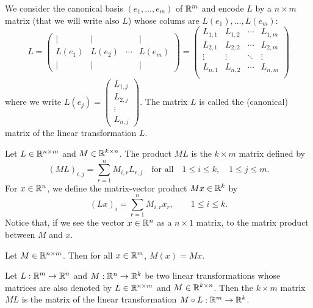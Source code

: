 \documentclass[11pt,nocut]{article}
\begin{document}
We consider the canonical basis $(e_1, \dots, e_m)$ of $\mathbb{R}^m$ and encode $L$ by a $n \times m$ matrix (that we will write also $L$) whose colums are $L(e_1), \dots, L(e_m)$:
$$
L =
\begin{pmatrix}
	| & | & & | \\
	L(e_1) & L(e_2) & \cdots& L(e_m) \\
	| & | & & |
\end{pmatrix}
= 
\begin{pmatrix}
	L_{1,1} & L_{1,2} & \cdots & L_{1,m} \\
	L_{2,1} & L_{2,2} & \cdots & L_{2,m} \\
	\vdots & \vdots & \ddots & \vdots \\
	L_{n,1} & L_{n,2} & \cdots & L_{n,m} \\
\end{pmatrix}
$$
where we write $L(e_j) = 
\begin{pmatrix}
	L_{1,j} \\
	L_{2,j}\\
	\vdots \\
	L_{n,j}
\end{pmatrix}$.
The matrix $L$ is called the (canonical) matrix of the linear transformation $L$.

\begin{definition}
	Let $L \in \mathbb{R}^{n \times m}$ and $M \in \mathbb{R}^{k \times n}$. The product $M L$ is the $k \times m$ matrix defined by
	$$
	(ML)_{i,j} = \sum_{r=1}^n M_{i,r} L_{r,j} \quad \text{for all} \quad 1 \leq i \leq k, \quad 1 \leq j \leq m.
	$$
	For $x \in \mathbb{R}^n$, we define the matrix-vector product $M x \in \mathbb{R}^k$ by
	$$
	(Lx)_i = \sum_{r=1}^n M_{i,r} x_r, \qquad 1 \leq i \leq k.
	$$
	Notice that, if we see the vector $x \in \mathbb{R}^n$ as a $n \times 1$ matrix, to the matrix product between $M$ and $x$.
\end{definition}

\begin{proposition}
	Let $M \in \mathbb{R}^{n \times m}$. Then for all $x \in \mathbb{R}^m$,
	$M(x) = Mx$.
\end{proposition}

\begin{proposition}
	Let $L: \mathbb{R}^m \to \mathbb{R}^n$ and $M: \mathbb{R}^n \to \mathbb{R}^k$ be two linear transformations whose matrices are also denoted by $L \in \mathbb{R}^{n \times m}$ and $M \in \mathbb{R}^{k \times n}$.
	Then the $k \times m$ matrix $ML$ is the matrix of the linear transformation $M \circ L: \mathbb{R}^m \to \mathbb{R}^k$.
\end{proposition}
\end{document}

